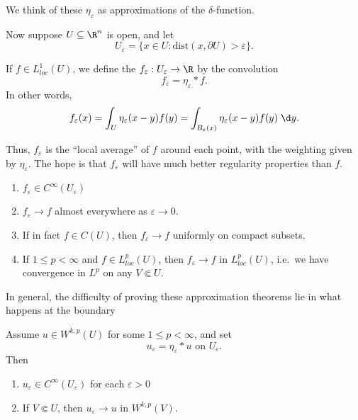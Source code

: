 \documentclass[a4paper]{article}
\begin{document}
We think of these $\eta_\varepsilon$ as approximations of the $\delta$-function.

Now suppose $U \subseteq \R^n$ is open, and let
\[
  U_\varepsilon = \{x \in U: \mathrm{dist}(x, \partial U) > \varepsilon\}.
\]
\begin{defi}[Mollification]
  If $f \in L^1_{loc}(U)$, we define the  $f_\varepsilon: U_\varepsilon \to \R$ by the convolution
  \[
    f_\varepsilon = \eta_\varepsilon * f.
  \]
  In other words,
  \[
    f_\varepsilon(x) = \int_U \eta_\varepsilon (x - y) f(y) = \int_{B_\varepsilon(x)} \eta_\varepsilon(x - y) f(y)\;\d y.
  \]
\end{defi}
Thus, $f_\varepsilon$ is the ``local average'' of $f$ around each point, with the weighting given by $\eta_\varepsilon$. The hope is that $f_\varepsilon$ will have much better regularity properties than $f$.

\begin{thm}\leavevmode
  \begin{enumerate}
    \item $f_\varepsilon \in C^\infty(U_\varepsilon)$
    \item $f_\varepsilon \to f$ almost everywhere as $\varepsilon \to 0$.
    \item If in fact $f \in C(U)$, then $f_\varepsilon \to f$ uniformly on compact subsets.
    \item If $1 \leq p < \infty$ and $f \in L^p_{loc}(U)$, then $f_\varepsilon \to f$ in $L^p_{loc}(U)$, i.e.\ we have convergence in $L^p$ on any $V \Subset U$.\qedsym
  \end{enumerate}
\end{thm}
In general, the difficulty of proving these approximation theorems lie in what happens at the boundary
\begin{lemma}
  Assume $u \in W^{k, p}(U)$ for some $1 \leq p < \infty$, and set
  \[
    u_\varepsilon = \eta_\varepsilon * u\text{ on }U_\varepsilon.
  \]
  Then
  \begin{enumerate}
    \item $u_\varepsilon \in C^\infty(U_\varepsilon)$ for each $\varepsilon > 0$
    \item If $V \Subset U$, then $u_\varepsilon \to u$ in $W^{k, p}(V)$.
  \end{enumerate}
\end{lemma}
\end{document}
